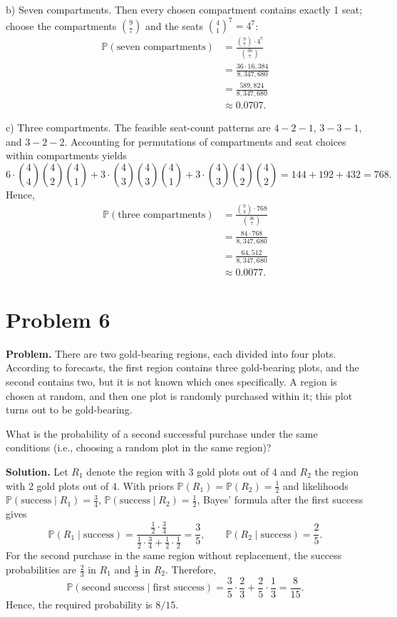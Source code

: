 \documentclass{article}
\begin{document}
b) Seven compartments. Then every chosen compartment contains exactly 1 seat; choose the compartments \(\binom{9}{7}\) and the seats \(\binom{4}{1}^7=4^7\):
\begin{align*}
\mathbb{P}(\text{seven compartments})
&= \frac{\binom{9}{7}\cdot 4^7}{\binom{36}{7}} \\
&= \frac{36 \cdot 16{,}384}{8{,}347{,}680} \\
&= \frac{589{,}824}{8{,}347{,}680} \\
&\approx 0.0707.
\end{align*}

c) Three compartments. The feasible seat-count patterns are \(4\!-\!2\!-\!1\), \(3\!-\!3\!-\!1\), and \(3\!-\!2\!-\!2\). Accounting for permutations of compartments and seat choices within compartments yields
\[
6\cdot\binom{4}{4}\binom{4}{2}\binom{4}{1}
+ 3\cdot\binom{4}{3}\binom{4}{3}\binom{4}{1}
+ 3\cdot\binom{4}{3}\binom{4}{2}\binom{4}{2}
= 144 + 192 + 432 = 768.
\]
Hence,
\begin{align*}
\mathbb{P}(\text{three compartments})
&= \frac{\binom{9}{3}\cdot 768}{\binom{36}{7}} \\
&= \frac{84 \cdot 768}{8{,}347{,}680} \\
&= \frac{64{,}512}{8{,}347{,}680} \\
&\approx 0.0077.
\end{align*}

\section{Problem 6}

\textbf{Problem.} There are two gold-bearing regions, each divided into four plots. According to forecasts, the first region contains three gold-bearing plots, and the second contains two, but it is not known which ones specifically. A region is chosen at random, and then one plot is randomly purchased within it; this plot turns out to be gold-bearing.

What is the probability of a second successful purchase under the same conditions (i.e., choosing a random plot in the same region)?

\textbf{Solution.} Let $R_1$ denote the region with 3 gold plots out of 4 and $R_2$ the region with 2 gold plots out of 4. With priors $\mathbb{P}(R_1)=\mathbb{P}(R_2)=\tfrac12$ and likelihoods $\mathbb{P}(\text{success}\mid R_1)=\tfrac34$, $\mathbb{P}(\text{success}\mid R_2)=\tfrac12$, Bayes' formula after the first success gives
\[
\mathbb{P}(R_1\mid \text{success})=\frac{\tfrac12\cdot\tfrac34}{\tfrac12\cdot\tfrac34+\tfrac12\cdot\tfrac12}=\frac{3}{5},\qquad
\mathbb{P}(R_2\mid \text{success})=\frac{2}{5}.
\]
For the second purchase in the same region without replacement, the success probabilities are $\tfrac{2}{3}$ in $R_1$ and $\tfrac{1}{3}$ in $R_2$. Therefore,
\[
\mathbb{P}(\text{second success}\mid \text{first success})=\frac{3}{5}\cdot\frac{2}{3}+\frac{2}{5}\cdot\frac{1}{3}=\frac{8}{15}.
\]
Hence, the required probability is $8/15$.
\end{document}
